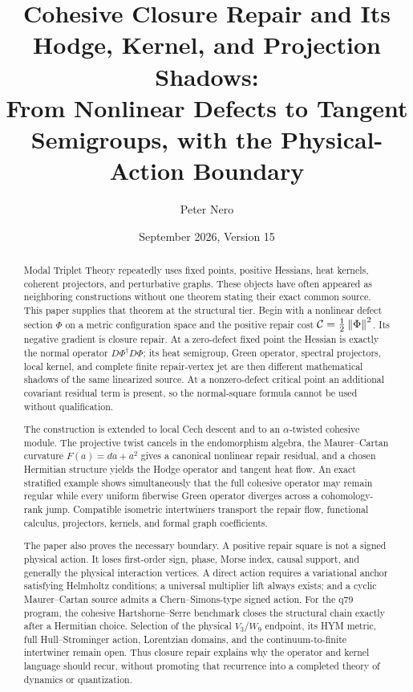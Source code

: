 \documentclass[11pt,a4paper]{article}
\title{\textbf{Cohesive Closure Repair and Its Hodge, Kernel, and Projection Shadows:}\\
\large From Nonlinear Defects to Tangent Semigroups, with the Physical-Action Boundary}
\author{Peter Nero}
\date{September 2026, Version 15}
\begin{document}
\maketitle

\begin{abstract}
Modal Triplet Theory repeatedly uses fixed points, positive Hessians, heat
kernels, coherent projectors, and perturbative graphs.  These objects have
often appeared as neighboring constructions without one theorem stating
their exact common source.  This paper supplies that theorem at the
structural tier.  Begin with a nonlinear defect section \(\Phi\) on a metric
configuration space and the positive repair cost
\(\mathcal{C}=\frac12\left\lVert \Phi \right\rVert^{2}\).  Its negative gradient is closure repair.
At a zero-defect fixed point the Hessian is exactly the normal operator
\(D\Phi^{\dagger}D\Phi\); its heat semigroup, Green operator, spectral
projectors, local kernel, and complete finite repair-vertex jet are then
different mathematical shadows of the same linearized source.  At a
nonzero-defect critical point an additional covariant residual term is
present, so the normal-square formula cannot be used without qualification.

The construction is extended to local Cech descent and to an
\(\alpha\)-twisted cohesive module.  The projective twist cancels in the
endomorphism algebra, the Maurer--Cartan curvature
\(F(a)=da+a^{2}\) gives a canonical nonlinear repair residual, and a chosen
Hermitian structure yields the Hodge operator and tangent heat flow.  An
exact stratified example shows simultaneously that the full cohesive
operator may remain regular while every uniform fiberwise Green operator
diverges across a cohomology-rank jump.  Compatible isometric intertwiners
transport the repair flow, functional calculus, projectors, kernels, and
formal graph coefficients.

The paper also proves the necessary boundary.  A positive repair square is
not a signed physical action.  It loses first-order sign, phase, Morse index,
causal support, and generally the physical interaction vertices.  A direct
action requires a variational anchor satisfying Helmholtz conditions; a
universal multiplier lift always exists; and a cyclic Maurer--Cartan source
admits a Chern--Simons-type signed action.  For the q79 program, the cohesive
Hartshorne--Serre benchmark closes the structural chain exactly after a
Hermitian choice.  Selection of the physical \(V_3/W_9\) endpoint, its HYM
metric, full Hull--Strominger action, Lorentzian domains, and the
continuum-to-finite intertwiner remain open.  Thus closure repair explains
why the operator and kernel language should recur, without promoting that
recurrence into a completed theory of dynamics or quantization.
\end{abstract}
\end{document}
